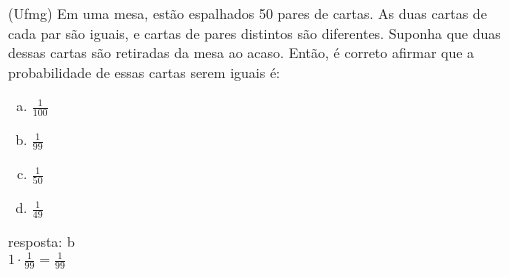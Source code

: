 \begin{ex}
(Ufmg) Em uma mesa, estão espalhados 50 pares de cartas. As duas cartas de cada par são iguais, e cartas de pares distintos são diferentes. Suponha que duas dessas cartas são retiradas da mesa ao acaso. Então, é correto afirmar que a probabilidade de essas cartas serem iguais é:
   \begin{enumerate}[(a)]
   \item $\frac{1}{100}$
   \item $\frac{1}{99}$
   \item $\frac{1}{50}$
   \item $\frac{1}{49}$
   \end{enumerate}
     \begin{sol}
      resposta: b \\
      $1\cdot\frac{1}{99}=\frac{1}{99}$
     \end{sol}
\end{ex}